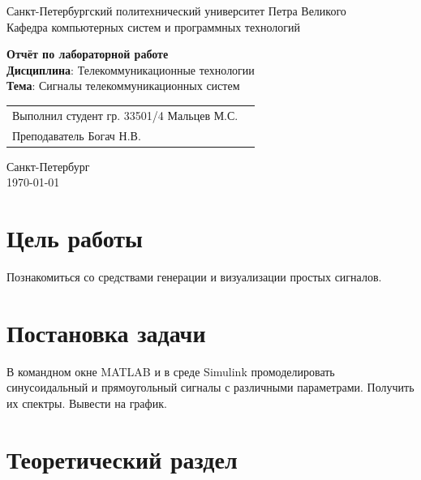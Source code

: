 \documentclass[a4paper,14pt]{extarticle}
\begin{document}
\begin{titlepage}
\centering
Санкт-Петербургский политехнический университет Петра Великого \\
\vspace{0.15cm}
Кафедра компьютерных систем и программных технологий \\
\vspace{6.5cm}

{\centering \textbf{Отчёт по лабораторной работе} \\ 
\vspace{0.15cm}
\textbf{Дисциплина}: Телекоммуникационные технологии \\
\vspace{0.15cm}
\textbf{Тема}: Сигналы телекоммуникационных
систем} \\

\vspace{6.5cm}

\begin{table}[H]
\begin{tabular}{p{\textwidth}@{}r}
{Выполнил студент гр. 33501/4} \hfill {Мальцев  М.С.} \\
{Преподаватель} \hfill {Богач Н.В.} \\
\end{tabular}
\end{table}
\vfill

{\centering Санкт-Петербург \\ 
\vspace{0.15cm}
\today}
\end{titlepage}

\section{Цель работы}

Познакомиться со средствами генерации и визуализации простых сигналов.

\section{Постановка задачи}

В командном окне MATLAB и в среде Simulink промоделировать синусоидальный и прямоугольный сигналы с различными параметрами. Получить их спектры. Вывести на график.

\section{Теоретический раздел}
\end{document}
